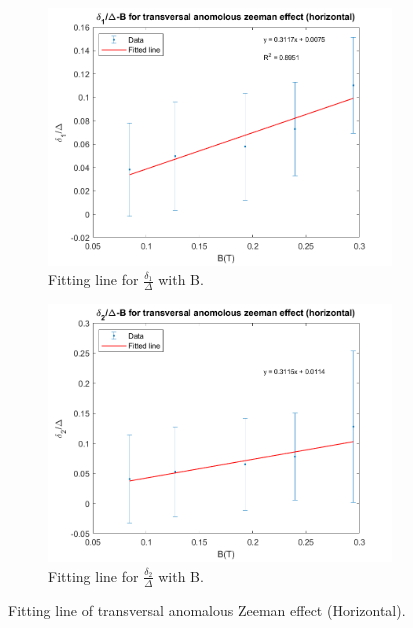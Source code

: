 \documentclass[a4paper,12pt]{article}
\begin{document}
    \begin{figure}[H]
        \centering
        \begin{subfigure}[b]{0.48\textwidth}
            \includegraphics[width=\textwidth]{tra_ano_hor_d1_data.png}
            \caption{Fitting line for $\frac{\delta_{1}}{\Delta}$ with B.}
        \end{subfigure}
        \begin{subfigure}[b]{0.48\textwidth}
            \includegraphics[width=\textwidth]{tra_ano_hor_d2_data.png}
            \caption{Fitting line for $\frac{\delta_{2}}{\Delta}$ with B.}
        \end{subfigure}
        \caption{Fitting line of transversal anomalous Zeeman effect (Horizontal).}
        \label{fig:tra_ano_hor_data}
    \end{figure}
    
\end{document}

